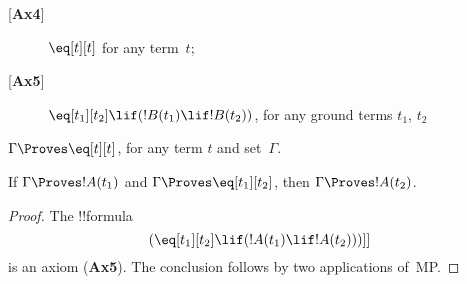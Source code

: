 \documentclass[../../include/open-logic-section]{subfiles}
\begin{document}


\begin{defn} 
\begin{description}
\item[{[\textbf{Ax4}]}] $\eq[t][t]$ for any term~$t$;
\item[{[\textbf{Ax5}]}] $\eq[t_1][t_2] \lif (!B(t_1) \lif
  !B(t_2))$, for any ground terms $t_1$, $t_2$
\end{description} 
\end{defn}

\begin{prop}
 $\Gamma \Proves \eq[t][t]$, for any term $t$ and set~$\Gamma$.
\end{prop}

\begin{prop}
  If $\Gamma \Proves !A(t_1)$ and $\Gamma \Proves
  \eq[t_1][t_2]$, then $\Gamma \Proves !A(t_2)$.
\end{prop}

\begin{proof}
The !!{formula}
\[
(\eq[t_1][t_2] \lif (!A(t_1) \lif !A(t_2)))]]
\]
is an axiom (\textbf{Ax5}). The conclusion follows by two applications
of~MP.
\end{proof}
\end{document}
